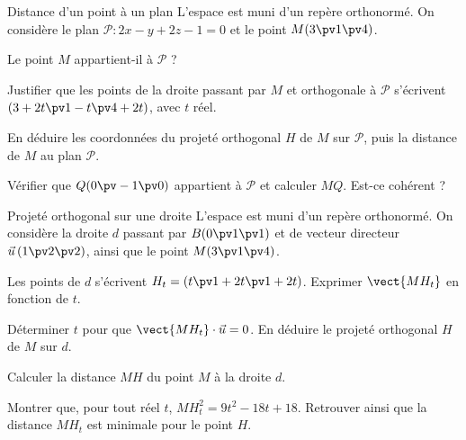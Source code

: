 \begin{exercice}[2]{Distance d'un point à un plan}
L'espace est muni d'un repère orthonormé. On considère le plan $\mathcal{P}:2x-y+2z-1=0$ et le point $M(3\pv1\pv4)$.
\begin{questions}
  \item Le point $M$ appartient-il à $\mathcal{P}$ ?
  \item Justifier que les points de la droite passant par $M$ et orthogonale à $\mathcal{P}$ s'écrivent $(3+2t\pv1-t\pv4+2t)$, avec $t$
    réel.
  \item En déduire les coordonnées du projeté orthogonal $H$ de $M$ sur $\mathcal{P}$, puis la distance de $M$ au plan $\mathcal{P}$.
  \item Vérifier que $Q(0\pv-1\pv0)$ appartient à $\mathcal{P}$ et calculer $MQ$. Est-ce cohérent ?
\end{questions}
\end{exercice}

\begin{exercice}[2]{Projeté orthogonal sur une droite}
L'espace est muni d'un repère orthonormé. On considère la droite $d$ passant par $B(0\pv1\pv1)$ et de vecteur directeur
$\vec u\,(1\pv2\pv2)$, ainsi que le point $M(3\pv1\pv4)$.
\begin{questions}
  \item Les points de $d$ s'écrivent $H_t=(t\pv1+2t\pv1+2t)$. Exprimer $\vect{MH_t}$ en fonction de $t$.
  \item Déterminer $t$ pour que $\vect{MH_t}\cdot\vec u=0$. En déduire le projeté orthogonal $H$ de $M$ sur $d$.
  \item Calculer la distance $MH$ du point $M$ à la droite $d$.
  \item Montrer que, pour tout réel $t$, $MH_t^2=9t^2-18t+18$. Retrouver ainsi que la distance $MH_t$ est minimale pour le point $H$.
\end{questions}
\end{exercice}


